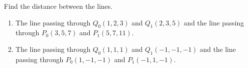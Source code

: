 Find the distance between the lines.

\begin{enumerate}
\item The line passing through $Q_0(1,2,3) $ and $Q_1(2,3,5)$ and the line passing through $P_0(3,5,7)$ and $P_1(5,7,11)$.
\item The line passing through $ Q_0(1,1,1)$ and $Q_1(-1,-1,-1)$ and the line passing through $P_0(1, -1, -1)$ and $P_1(-1,1,-1)$.
\end{enumerate}